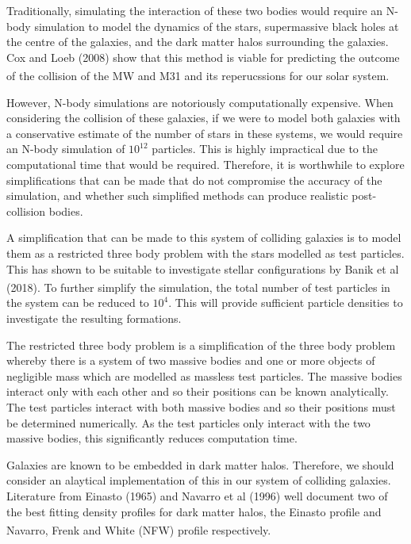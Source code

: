 \documentclass[10pt, twocolumn]{revtex4}    %
\begin{document}
Traditionally, simulating the interaction of these two bodies would require an N-body simulation to model the dynamics of the stars, supermassive black holes at the centre of the galaxies, and the dark matter halos surrounding the galaxies. Cox and Loeb (2008) show that this method is viable for predicting the outcome of the collision of the MW and M31 and its reperucssions for our solar system.\textsuperscript{\cite{CoxCollisionMilkyWay2008}}

However, N-body simulations are notoriously computationally expensive. When considering the collision of these galaxies, if we were to model both galaxies with a conservative estimate of the number of stars in these systems, we would require an N-body simulation of $10^{12}$ particles. This is highly impractical due to the computational time that would be required. Therefore, it is worthwhile to explore simplifications that can be made that do not compromise the accuracy of the simulation, and whether such simplified methods can produce realistic post-collision bodies.

A simplification that can be made to this system of colliding galaxies is to model them as a restricted three body problem with the stars modelled as test particles. This has shown to be suitable to investigate stellar configurations by Banik et al (2018).\textsuperscript{\cite{BanikOriginLocalGroup2018}} To further simplify the simulation, the total number of test particles in the system can be reduced to $10^4$. This will provide sufficient particle densities to investigate the resulting formations.

The restricted three body problem is a simplification of the three body problem whereby there is a system of two massive bodies and one or more objects of negligible mass which are modelled as massless test particles. The massive bodies interact only with each other and so their positions can be known analytically. The test particles interact with both massive bodies and so their positions must be determined numerically. As the test particles only interact with the two massive bodies, this significantly reduces computation time. 

Galaxies are known to be embedded in dark matter halos. Therefore, we should consider an alaytical implementation of this in our system of colliding galaxies. Literature from Einasto (1965) and Navarro et al (1996) well document two of the best fitting density profiles for dark matter halos, the Einasto profile and Navarro, Frenk and White (NFW) profile respectively.\textsuperscript{\cite{EinastoConstructionCompositeModel1965}\cite{NavarroStructureColdDark1996}}
\end{document}
